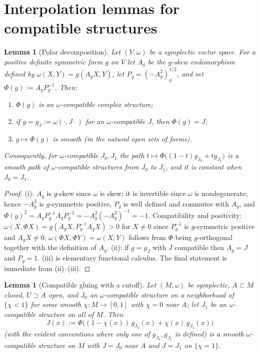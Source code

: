 \documentclass[11pt]{amsart}
\theoremstyle{plain}
\newtheorem{lemma}[theorem]{Lemma}
\theoremstyle{definition}
\begin{document}
\section{Interpolation lemmas for compatible structures}\label{sec:interp}

\begin{lemma}[Polar decomposition]\label{lem:polar}
Let $(V,\omega)$ be a symplectic vector space. For a positive definite
symmetric form $g$ on $V$ let $A_g$ be the $g$-skew endomorphism defined by
$\omega(X,Y)=g(A_gX,Y)$, let $P_g=(-A_g^2)^{1/2}_g$, and set
$\Phi(g):=A_gP_g^{-1}$. Then:
\begin{enumerate}
\item[(i)] $\Phi(g)$ is an $\omega$-compatible complex structure;
\item[(ii)] if $g=g_J:=\omega(\cdot,J\cdot)$ for an $\omega$-compatible $J$,
then $\Phi(g)=J$;
\item[(iii)] $g\mapsto\Phi(g)$ is smooth (in the natural open sets of forms).
\end{enumerate}
Consequently, for $\omega$-compatible $J_0,J_1$ the path
$t\mapsto\Phi\bigl((1-t)g_{J_0}+tg_{J_1}\bigr)$ is a smooth path of
$\omega$-compatible structures from $J_0$ to $J_1$, and it is constant when
$J_0=J_1$.
\end{lemma}

\begin{proof}
(i): $A_g$ is $g$-skew since $\omega$ is skew; it is invertible since $\omega$
is nondegenerate; hence $-A_g^2$ is $g$-symmetric positive, $P_g$ is well
defined and commutes with $A_g$, and $\Phi(g)^2=A_gP_g^{-1}A_gP_g^{-1}
= -A_g^2(-A_g^2)^{-1}=-1$. Compatibility and positivity:
$\omega(X,\Phi X)=g(A_gX,P_g^{-1}A_gX)>0$ for $X\neq0$ since $P_g^{-1}$ is
$g$-symmetric positive and $A_gX\neq0$; $\omega(\Phi X,\Phi Y)=\omega(X,Y)$
follows from $\Phi$ being $g$-orthogonal together with the definition of
$A_g$. (ii): if $g=g_J$ with $J$ compatible then $A_g=J$ and $P_g=1$. (iii) is
elementary functional calculus. The final statement is immediate from
(ii)--(iii).
\end{proof}

\begin{lemma}[Compatible gluing with a cutoff]\label{lem:glue}
Let $(M,\omega)$ be symplectic, $A\subset M$ closed, $U\supset A$ open, and
$J_0$ an $\omega$-compatible structure on a neighborhood of
$\overline{\{\chi<1\}}$ for some smooth $\chi:M\to[0,1]$ with $\chi=0$ near
$A$; let $J_1$ be an $\omega$-compatible structure on all of $M$. Then
\[
 J(x):=\Phi\bigl((1-\chi(x))\,g_{J_0}(x)+\chi(x)\,g_{J_1}(x)\bigr)
\]
(with the evident conventions where only one of $g_{J_0},g_{J_1}$ is defined)
is a smooth $\omega$-compatible structure on $M$ with $J=J_0$ near $A$ and
$J=J_1$ on $\{\chi=1\}$.
\end{lemma}
\end{document}
